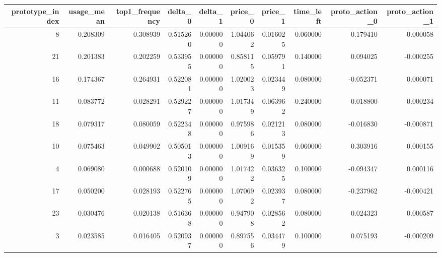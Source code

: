 \begin{tabular}{rrrrrrrrrr}
\toprule
prototype_index & usage_mean & top1_frequency & delta_0 & delta_1 & price_0 & price_1 & time_left & proto_action_0 & proto_action_1 \\
\midrule
8 & 0.208309 & 0.308939 & 0.515260 & 0.000000 & 1.044062 & 0.016025 & 0.060000 & 0.179410 & -0.000058 \\
21 & 0.201383 & 0.202259 & 0.533955 & 0.000000 & 0.858115 & 0.059791 & 0.140000 & 0.094025 & -0.000255 \\
16 & 0.174367 & 0.264931 & 0.522081 & 0.000000 & 1.020023 & 0.023449 & 0.080000 & -0.052371 & 0.000071 \\
11 & 0.083772 & 0.028291 & 0.529227 & 0.000000 & 1.017349 & 0.063962 & 0.240000 & 0.018800 & 0.000234 \\
18 & 0.079317 & 0.080059 & 0.522348 & 0.000000 & 0.975986 & 0.021213 & 0.080000 & -0.016830 & -0.000871 \\
10 & 0.075463 & 0.049902 & 0.505013 & 0.000000 & 1.009169 & 0.015359 & 0.060000 & 0.303916 & 0.000155 \\
4 & 0.069080 & 0.000688 & 0.520109 & 0.000000 & 1.017422 & 0.036325 & 0.100000 & -0.094347 & 0.000116 \\
17 & 0.050200 & 0.028193 & 0.522765 & 0.000000 & 1.070692 & 0.023937 & 0.080000 & -0.237962 & -0.000421 \\
23 & 0.030476 & 0.020138 & 0.516368 & 0.000000 & 0.947908 & 0.028562 & 0.080000 & 0.024323 & 0.000587 \\
3 & 0.023585 & 0.016405 & 0.520937 & 0.000000 & 0.897556 & 0.034479 & 0.100000 & 0.075193 & -0.000209 \\
\bottomrule
\end{tabular}
